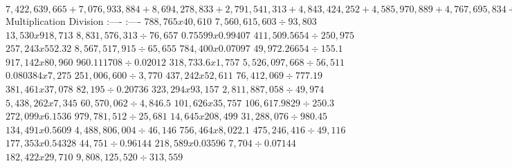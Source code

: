 \(7,422,639,665+7,076,933,884+8,694,278,833+2,791,541,313+4,843,424,252+4,585,970,889+4,767,695,834+7,745,519,868+6,614,663,568+5,753,224,187\)
\textbar{} Multiplication \textbar{} Division \textbar{} \textbar:----
\textbar:---- \textbar{} \textbar{} \(788,765 x 40,610\) \textbar{}
\(7,560,615,603÷93,803\) \textbar{} \textbar{} \(13,530 x 918,713\)
\textbar{} \(8,831,576,313÷76,657\) \textbar{} \textbar{}
\(0.75599 x 0.99407\) \textbar{} \(411,509.5654÷250,975\) \textbar{}
\textbar{} \(257,243 x 552.32\) \textbar{} \(8,567,517,915÷65,655\)
\textbar{} \textbar{} \(784,400 x 0.07097\) \textbar{}
\(49,972.26654÷155.1\) \textbar{} \textbar{} \(917,142 x 80,960\)
\textbar{} \(960.111708÷0.02012\) \textbar{} \textbar{}
\(318,733.6 x 1,757\) \textbar{} \(5,526,097,668÷56,511\) \textbar{}
\textbar{} \(0.080384 x 7,275\) \textbar{} \(251,006,600÷3,770\)
\textbar{} \textbar{} \(437,242 x 52,611\) \textbar{}
\(76,412,069÷777.19\) \textbar{} \textbar{} \(381,461 x 37,078\)
\textbar{} \(82,195÷0.20736\) \textbar{} \textbar{} \(323,294x 93,157\)
\textbar{} \(2,811,887,058÷49,974\) \textbar{} \textbar{}
\(5,438,262 x 7,345\) \textbar{} \(60,570,062÷4,846.5\) \textbar{}
\textbar{} \(101,626 x 35,757\) \textbar{} \(106,617.9829÷250.3\)
\textbar{} \textbar{} \(272,099 x 6.1536\) \textbar{}
\(979,781,512÷25,681\) \textbar{} \textbar{} \(14,645 x 208,499\)
\textbar{} \(31,288,076÷980.45\) \textbar{} \textbar{}
\(134,491 x 0.5609\) \textbar{} \(4,488,806,004÷46,146\) \textbar{}
\textbar{} \(756,464x 8,022.1\) \textbar{} \(475,246,416÷49,116\)
\textbar{} \textbar{} \(177,353 x 0.54328\) \textbar{}
\(44,751÷0.96144\) \textbar{} \textbar{} \(218,589x0.03596\) \textbar{}
\(7,704÷0.07144\) \textbar{} \textbar{} \(182,422 x 29,710\) \textbar{}
\(9,808,125,520÷313,559\) \textbar{}

